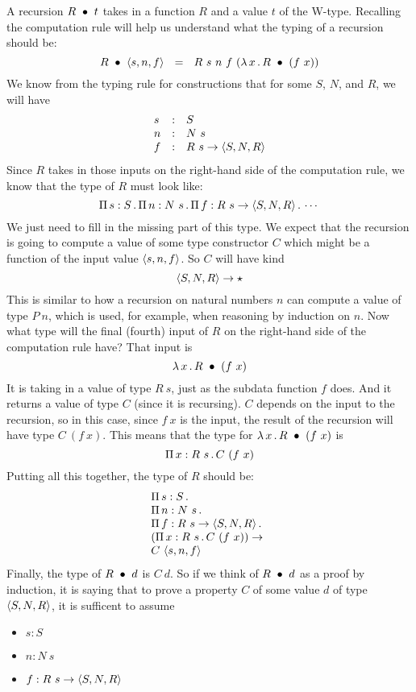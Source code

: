 \documentclass{article}
\begin{document}
A recursion $R\ \bullet\ t$ takes in a function $R$ and a value $t$ of the W-type.
Recalling the computation rule will help us understand what the typing of a recursion
should be:
\[
\wrec{R}{\ctor{s}{n}{f}} \ \ = \ \ R\ s\ n\ f\ (\lam{x}{\wrec{R}{(f\ x)}})
\]
\noindent We know from the typing rule for constructions that for some $S$, $N$, and $R$, we will have
\[
\begin{array}{lll}
  s & : & S \\
  n & : & N\ s \\
  f & : & R\ s \to \langle S , N , R \rangle
\end{array}
\]
\noindent Since $R$ takes in those inputs on the right-hand side of the computation rule,
we know that the type of $R$ must look like:
\[
\Pia{s}{S}{\Pia{n}{N\ s}{\Pia{f}{R\ s \to \w{S}{N}{R}}{\cdots}}}
\]
\noindent We just need to fill in the missing part of this type.  We expect that
the recursion is going to compute a value of some type constructor $C$ which might
be a function of the input value $\langle s , n, f \rangle$.  So $C$ will have kind
\[
\langle S , N , R \rangle \to \star
\]
\noindent This is similar to how a recursion on natural numbers $n$ can compute a value of type $P\ n$,
which is used, for example, when reasoning by induction on $n$.  Now what type will the final (fourth)
input of $R$ on the right-hand side of the computation rule have?  That input is
\[
\lambda\, x\, .\, R\ \bullet\ (f\ x)
\]
\noindent It is taking in a value of type $R\ s$, just as the subdata function $f$ does.  And it returns
a value of type $C$ (since it is recursing).  $C$ depends on the input to the recursion, so in this case,
since $f\ x$ is the input, the result of the recursion will have type $C\ (f\ x)$.  This means that the
type for $\lambda\, x\, .\, R\ \bullet\ (f\ x)$ is
\[
\Pi\, x: R\ s\, .\, C\ (f\ x)
\]
\noindent Putting all this together, the type of $R$ should be:
\[
\begin{array}{l}
  \Pi\, s: S\, .\, \ \\
  \Pi\, n: N\ s\, .\, \ \\
  \Pi\, f: R\ s \to \langle S , N , R \rangle\, .\, \  \\
  (\Pi\, x: R\ s\, .\, C\ (f\ x)) \to \\
  C\ \langle s , n, f \rangle
  \end{array}
\]
\noindent Finally, the type of $R\ \bullet\ d$ is $C\ d$.  So if we think of $R\ \bullet\ d$
as a proof by induction, it is saying that to prove a property $C$ of some value $d$ of
type $\langle S , N , R \rangle$, it is sufficent to assume

\begin{itemize}
\item $s : S$
\item $n : N\ s$
\item $f:R\ s \to \langle S , N , R \rangle$
\end{itemize}
\end{document}
